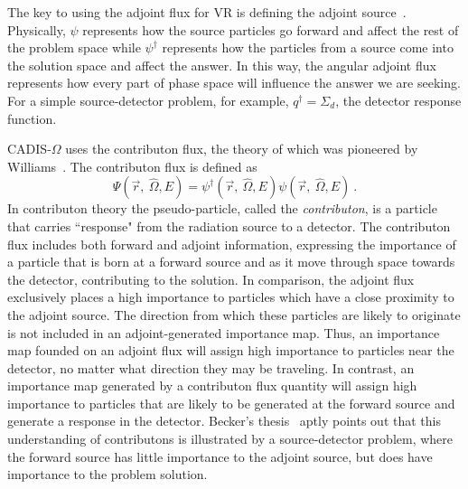 \documentclass[12pt]{article}
\newcommand{\vOmega}{\ensuremath{\hat{\Omega}}}
\begin{document}
The key to using the adjoint flux for VR is defining the adjoint source~\cite{wagner_forward-weighted_2007}. 
Physically, $\psi$ represents how the source particles go forward and affect the rest of the problem space while $\psi^{\dagger}$ represents how the particles from a source come into the solution space and affect the answer. 
In this way, the angular adjoint flux represents how every part of phase space will influence the answer we are seeking.
For a simple source-detector problem, for example, $q^\dagger = \Sigma _{ d }$, the detector response function. 

CADIS-$\Omega$ uses the contributon flux, the theory of which was pioneered by Williams~\cite{williams_generalized_1991,williams_contributorn_1992,williams_contributon_study}. 
The contributon flux is defined as
%
\begin{equation}
\Psi (\vec {r},\:\hat\Omega ,E) = \psi^{\dagger} (\vec {r},\:\hat\Omega ,E) \psi(\vec {r} ,\:\hat\Omega,E)\:.
\end{equation}
\label{eq.Cont-Flux} 
%
In contributon theory the pseudo-particle, called the \textit{contributon}, is a particle that carries ``response" from the radiation source to a detector. 
The contributon flux includes both forward and adjoint information, expressing the importance of a particle that is born at a forward source and as it move through space towards the detector, contributing to the solution.
In comparison, the adjoint flux exclusively places a high importance to particles which have a close proximity to the adjoint source. The direction from which these particles are likely to originate is not included in an adjoint-generated importance map.  Thus, an importance map founded on an adjoint flux will assign high importance to particles near the detector, no matter what direction they may be traveling. In contrast, an importance map generated by a contributon flux quantity will assign high importance to particles that are likely to be generated at the forward source and generate a response in the detector. 
Becker's thesis~\cite{becker_hybrid_2009} aptly points out that this understanding of contributons is illustrated by a source-detector problem, where the forward source has little importance to the adjoint source, but does have importance to the problem solution.
\end{document}
